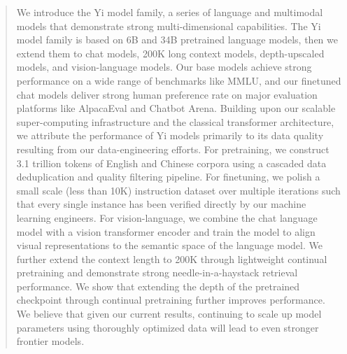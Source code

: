 \documentclass[numbers,sort&compress]{article}
\newcommand{\blue}[1]{\textcolor{blue}{#1}}
\newcommand{\alex}[1]{\textcolor{blue}{[Research Team] Alex: #1}}
\newcommand{\eddy}[1]{\textcolor{blue}{[Research Team] Eddy: #1}}
\begin{document}
\begin{abstract}
% 
We introduce the Yi model family, a series of language and multimodal models that demonstrate strong multi-dimensional capabilities. 
The Yi model family is based on 6B and 34B pretrained language models, then we extend them to chat models, 200K long context models, depth-upscaled models, and vision-language models. 
Our base models achieve strong performance on a wide range of benchmarks like MMLU, 
and our finetuned chat models deliver strong human preference rate on major evaluation platforms like AlpacaEval and Chatbot Arena.
Building upon our scalable super-computing infrastructure and the classical transformer architecture, 
we attribute the performance of Yi models primarily to its data quality resulting from our data-engineering efforts. 
For pretraining, we construct 3.1 trillion tokens of English and Chinese corpora using a cascaded data deduplication and quality filtering  pipeline. 
For finetuning, we polish a small scale (less than 10K) instruction dataset over multiple iterations such that every single instance has been verified directly by our machine learning engineers.
For vision-language, we combine the chat language model with a vision transformer encoder and train the model to align visual representations to the semantic space of the language model. 
We further extend the context length to 200K through lightweight continual pretraining and demonstrate strong needle-in-a-haystack retrieval performance. 
We show that extending the depth of the pretrained checkpoint through continual pretraining further improves performance. 
We believe that given our current results, continuing to scale up model parameters using thoroughly optimized data will lead to even stronger frontier models.

\end{abstract}
\end{document}
